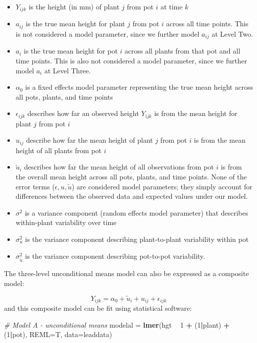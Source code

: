 \documentclass[
]{krantz}
\newenvironment{Shaded}{\begin{snugshade}}{\end{snugshade}}
\newcommand{\CommentTok}[1]{\textcolor[rgb]{0.37,0.37,0.37}{\textit{#1}}}
\newcommand{\DataTypeTok}[1]{\textcolor[rgb]{0.27,0.27,0.27}{#1}}
\newcommand{\DecValTok}[1]{\textcolor[rgb]{0.06,0.06,0.06}{#1}}
\newcommand{\KeywordTok}[1]{\textcolor[rgb]{0.27,0.27,0.27}{\textbf{#1}}}
\newcommand{\NormalTok}[1]{#1}
\newcommand{\OperatorTok}[1]{\textcolor[rgb]{0.43,0.43,0.43}{\textbf{#1}}}
\newcommand{\StringTok}[1]{\textcolor[rgb]{0.5,0.5,0.5}{#1}}
\providecommand{\tightlist}{%
  \setlength{\itemsep}{0pt}\setlength{\parskip}{0pt}}
\begin{document}
\begin{itemize}
\tightlist
\item
  \(Y_{ijk}\) is the height (in mm) of plant \(j\) from pot \(i\) at time \(k\)
\item
  \(a_{ij}\) is the true mean height for plant \(j\) from pot \(i\) across all time points. This is not considered a model parameter, since we further model \(a_{ij}\) at Level Two.
\item
  \(a_{i}\) is the true mean height for pot \(i\) across all plants from that pot and all time points. This is also not considered a model parameter, since we further model \(a_{i}\) at Level Three.
\item
  \(\alpha_{0}\) is a fixed effects model parameter representing the true mean height across all pots, plants, and time points
\item
  \(\epsilon_{ijk}\) describes how far an observed height \(Y_{ijk}\) is from the mean height for plant \(j\) from pot \(i\)
\item
  \(u_{ij}\) describe how far the mean height of plant \(j\) from pot \(i\) is from the mean height of all plants from pot \(i\)
\item
  \(\tilde{u}_{i}\) describes how far the mean height of all observations from pot \(i\) is from the overall mean height across all pots, plants, and time points. None of the error terms (\(\epsilon, u, \tilde{u}\)) are considered model parameters; they simply account for differences between the observed data and expected values under our model.
\item
  \(\sigma^2\) is a variance component (random effects model parameter) that describes within-plant variability over time
\item
  \(\sigma_{u}^{2}\) is the variance component describing plant-to-plant variability within pot
\item
  \(\sigma_{\tilde{u}}^{2}\) is the variance component describing pot-to-pot variability.
\end{itemize}

The three-level unconditional means model can also be expressed as a composite model:

\begin{equation*}
Y_{ijk}=\alpha_{0}+\tilde{u}_{i}+u_{ij}+\epsilon_{ijk}
\end{equation*}
and this composite model can be fit using statistical software:

\begin{Shaded}
\begin{Highlighting}[]
\CommentTok{# Model A - unconditional means}
\NormalTok{modelal =}\StringTok{ }\KeywordTok{lmer}\NormalTok{(hgt }\OperatorTok{~}\StringTok{ }\DecValTok{1} \OperatorTok{+}\StringTok{ }\NormalTok{(}\DecValTok{1}\OperatorTok{|}\NormalTok{plant) }\OperatorTok{+}\StringTok{ }\NormalTok{(}\DecValTok{1}\OperatorTok{|}\NormalTok{pot), }
               \DataTypeTok{REML=}\NormalTok{T, }\DataTypeTok{data=}\NormalTok{leaddata)}
\end{Highlighting}
\end{Shaded}
\end{document}
